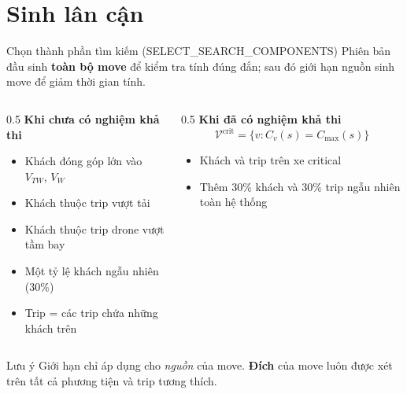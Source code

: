 \documentclass[aspectratio=169]{beamer}
\newcommand{\hl}[1]{\textcolor{blue!60!black}{\textbf{#1}}}
\begin{document}
\section{Sinh lân cận}

\begin{frame}{Chọn thành phần tìm kiếm (SELECT\_SEARCH\_COMPONENTS)}
  \small Phiên bản đầu sinh \hl{toàn bộ move} để kiểm tra tính đúng đắn; sau đó giới hạn nguồn sinh move để giảm thời gian tính.

  \begin{columns}[T]
    \begin{column}{0.5\textwidth}
      \textbf{Khi chưa có nghiệm khả thi}
      \begin{itemize}
        \item \small Khách đóng góp lớn vào $V_{TW}$, $V_W$
        \item \small Khách thuộc trip vượt tải
        \item \small Khách thuộc trip drone vượt tầm bay
        \item \small Một tỷ lệ khách ngẫu nhiên (30\%)
        \item \small Trip = các trip chứa những khách trên
      \end{itemize}
    \end{column}
    \begin{column}{0.5\textwidth}
      \textbf{Khi đã có nghiệm khả thi}
      $$\mathcal{V}^{\text{crit}} = \{v : C_v(s) = C_{\max}(s)\}$$
      \begin{itemize}
        \item \small Khách và trip trên xe critical
        \item \small Thêm 30\% khách và 30\% trip ngẫu nhiên toàn hệ thống
      \end{itemize}
    \end{column}
  \end{columns}

  \vspace{2mm}
  \begin{block}{Lưu ý}
    \small Giới hạn chỉ áp dụng cho \emph{nguồn} của move. \hl{Đích} của move luôn được xét trên tất cả phương tiện và trip tương thích.
  \end{block}
\end{frame}
\end{document}
